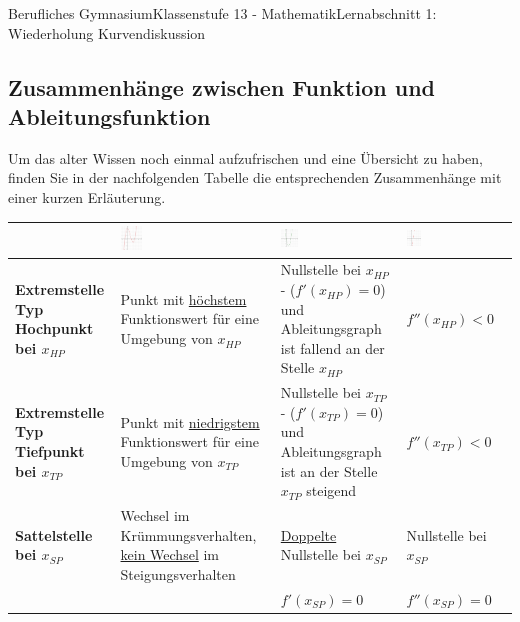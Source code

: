 \documentclass[11pt,twocolumn,oneside,openany,headings=optiontotoc,11pt,numbers=noenddot]{article}
\begin{document}
\begin{worksheet}{Berufliches Gymnasium}{Klassenstufe 13 - Mathematik}{Lernabschnitt 1: Wiederholung Kurvendiskussion}
		\subsection{Zusammenhänge zwischen Funktion und Ableitungsfunktion}
		\label{zsmhg}
		Um das alter Wissen noch einmal aufzufrischen und eine Übersicht zu haben, finden Sie in der nachfolgenden Tabelle die entsprechenden Zusammenhänge mit einer kurzen Erläuterung.\\
		\newpage
		\setlength{\columnseprule}{0pt}
		\begin{tabularx}{\textwidth}{|X|X|X|X|}
			\multicolumn{1}{X|}{}& \includegraphics[width=0.15\textwidth]{../99_Bilder/00_Wdh/Bsp.png} & \includegraphics[width=0.15\textwidth]{../99_Bilder/00_Wdh/Bsp'.png} & \includegraphics[width=0.15\textwidth]{../99_Bilder/00_Wdh/Bsp''.png}\\
			\hline
			\hline
			\textbf{Extremstelle Typ Hochpunkt bei \(x_{HP}\)} & Punkt mit \underline{höchstem} Funktionswert für eine Umgebung von \(x_{HP}\) & Nullstelle bei \(x_{HP}\) - (\(f'(x_{HP}) = 0\)) und Ableitungsgraph ist fallend an der Stelle \(x_{HP}\) & \(f''(x_{HP}) < 0\)\\
			\hline
			\textbf{Extremstelle Typ Tiefpunkt bei \(x_{TP}\)} & Punkt mit \underline{niedrigstem} Funktionswert für eine Umgebung von \(x_{TP}\) & Nullstelle bei \(x_{TP}\) - (\(f'(x_{TP}) = 0\)) und Ableitungsgraph ist an der Stelle \(x_{TP}\) steigend & \(f''(x_{TP}) < 0\)\\
			\hline
			\textbf{Sattelstelle bei \(x_{SP}\)} & Wechsel im Krümmungsverhalten, \underline{kein Wechsel} im Steigungsverhalten & \underline{Doppelte} Nullstelle bei \(x_{SP}\) & Nullstelle bei \(x_{SP}\)\\
			& & \(f'(x_{SP}) = 0\) & \(f''(x_{SP}) = 0\)\\

\end{tabularx}
\end{worksheet}
\end{document}
